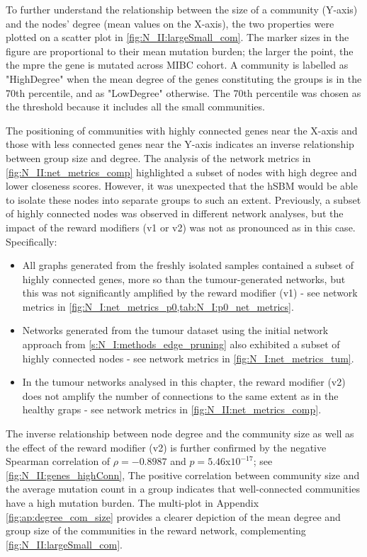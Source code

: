 To further understand the relationship between the size of a community (Y-axis) and the nodes' degree (mean values on the X-axis), the two properties were plotted on a scatter plot in \cref{fig:N_II:largeSmall_com}. The marker sizes in the figure are proportional to their mean mutation burden; the larger the point, the the mpre the gene is mutated across MIBC cohort. A community is labelled as "HighDegree" when the mean degree of the genes constituting the groups is in the 70th percentile, and as "LowDegree" otherwise. The 70th percentile was chosen as the threshold because it includes all the small communities.

The positioning of communities with highly connected genes near the X-axis and those with less connected genes near the Y-axis indicates an inverse relationship between group size and degree. The analysis of the network metrics in \cref{fig:N_II:net_metrics_comp} highlighted a subset of nodes with high degree and lower closeness scores. However, it was unexpected that the hSBM would be able to isolate these nodes into separate groups to such an extent. Previously, a subset of highly connected nodes was observed in different network analyses, but the impact of the reward modifiers (v1 or v2) was not as pronounced as in this case. Specifically:
\begin{itemize}
    \item All graphs generated from the freshly isolated samples contained a subset of highly connected genes, more so than the tumour-generated networks, but this was not significantly amplified by the reward modifier (v1) - see network metrics in \cref{fig:N_I:net_metrics_p0,tab:N_I:p0_net_metrics}.
    \item Networks generated from the tumour dataset using the initial network approach from \cref{s:N_I:methods_edge_pruning} also exhibited a subset of highly connected nodes - see network metrics in \cref{fig:N_I:net_metrics_tum}.
    \item In the tumour networks analysed in this chapter, the reward modifier (v2) does not amplify the number of connections to the same extent as in the healthy graps - see network metrics in \cref{fig:N_II:net_metrics_comp}.
\end{itemize}

The inverse relationship between node degree and the community size as well as the effect of the reward modifier (v2)  is further confirmed by the negative Spearman correlation of $\rho = -0.8987$ and $p = 5.46$x$10^{-17}$; see \cref{fig:N_II:genes_highConn}, The positive correlation between community size and the average mutation count in a group indicates that well-connected communities have a high mutation burden. The multi-plot in Appendix \cref{fig:ap:degree_com_size} provides a clearer depiction of the mean degree and group size of the communities in the reward network, complementing \cref{fig:N_II:largeSmall_com}.

